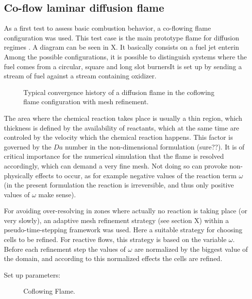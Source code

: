 
\subsection{Co-flow laminar diffusion flame}\label{ssec:coflowFlame}
As a first test to assess basic combustion behavior, a co-flowing flame configuration was used. This test case is the main prototype flame for diffusion regimes \cite{poinsotTheoreticalNumericalCombustion2005}.  A diagram can be seen in X. It basically consists on a fuel jet enterin Among the possible configurations, it is possible to distinguish systems where the fuel comes from a circular, square and long slot burnersIt is set up by sending a stream of fuel against a stream containing oxidizer.
\begin{figure}[t!]
	\centering
	\caption{Typical convergence history of a diffusion flame in the coflowing flame configuration with mesh refinement.}
	\label{fig:CoFlow_ConvergenceStory}
\end{figure}

The area where the chemical reaction takes place is usually a thin region, which thickness is defined by the availability of reactants, which at the same time are controled by the velocity which the chemical reaction happens. This factor is governed by the $Da$ number in the non-dimensional formulation (sure??). It is of critical importance for the numerical simulation that the flame is resolved accordingly, which can demand a very fine mesh. Not doing so can provoke non-physically effects to occur, as for example negative values of the reaction term $\omega$ (in the present formulation the reaction is irreversible, and thus only positive values of $\omega$ make sense).

For avoiding over-resolving in zones where actually no reaction is taking place (or very slowly), an adaptive mesh refinement strategy  (see section X) within a pseudo-time-stepping framework was used.  Here a suitable strategy for choosing cells to be refined. For reactive flows, this strategy is based on the variable $\omega$.
Before each refinement step the values of $\omega$ are normalized by the biggest value of the domain, and according to this normalized effects the cells are refined. %

Set up parameters: 
\begin{figure}[t]
	\centering
	\pgfplotsset{width=0.75\textwidth, compat=1.3}
	\caption{Coflowing Flame.} \label{fig:CoFlowFlameFig}
\end{figure}


